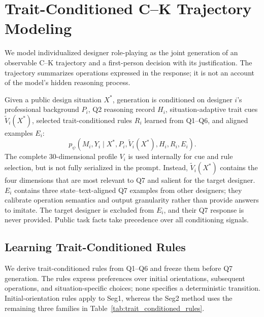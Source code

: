 \section{Trait-Conditioned C--K Trajectory Modeling}
\label{sec:trait_conditioned_cktm}

We model individualized designer role-playing as the joint generation of an
observable C--K trajectory and a first-person decision with its justification.
The trajectory summarizes operations expressed in the response; it is not an
account of the model's hidden reasoning process.

Given a public design situation $X^\ast$, generation is conditioned on
designer $i$'s professional background $P_i$, Q2 reasoning record $H_i$,
situation-adaptive trait cues $\widetilde V_i(X^\ast)$, selected
trait-conditioned rules $R_i$ learned from Q1--Q6, and aligned examples $E_i$:
\begin{equation}
p_\psi(M_i,Y_i\mid
X^\ast,P_i,\widetilde V_i(X^\ast),H_i,R_i,E_i).
\label{eq:tcktm_joint}
\end{equation}
The complete 30-dimensional profile $V_i$ is used internally for cue and rule
selection, but is not fully serialized in the prompt. Instead,
$\widetilde V_i(X^\ast)$ contains the four dimensions that are most relevant
to Q7 and salient for the target designer. $E_i$ contains three
state--text-aligned Q7 examples from other designers; they calibrate operation
semantics and output granularity rather than provide answers to imitate. The
target designer is excluded from $E_i$, and their Q7 response is never
provided. Public task facts take precedence over all conditioning signals.

\subsection{Learning Trait-Conditioned Rules}

We derive trait-conditioned rules from Q1--Q6 and freeze them before Q7
generation. The rules express preferences over initial orientations,
subsequent operations, and situation-specific choices; none specifies a
deterministic transition. Initial-orientation rules apply to Seg1, whereas the
Seg2 method uses the remaining three families in
Table~\ref{tab:trait_conditioned_rules}.

